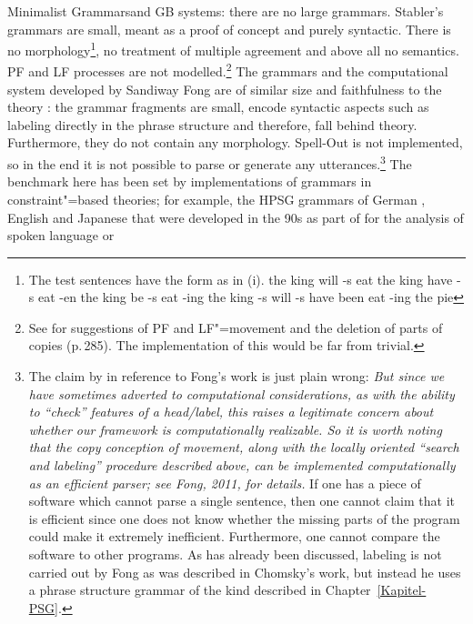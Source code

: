 Minimalist Grammars\indexmg and GB systems: there are no large grammars. Stabler's grammars are small, meant as a proof of concept and purely
syntactic. There is no morphology\footnote{%
	The test sentences have the form as in (i).
\eal
\ex the king will -s eat
\ex the king have -s eat -en
\ex the king be -s eat -ing
\ex the king -s will -s have been eat -ing the pie
\zllast
}, no treatment of multiple agreement \citep[Section~27.4.3]{Stabler2010b} and above all no semantics. PF and LF
processes are not modelled.\footnote{%
	See \citet{SE2002a} for suggestions of PF and LF"=movement and the deletion of parts of copies (p.\,285).
	The implementation of this would be far from trivial.
} 
The grammars and the computational system developed by Sandiway Fong are of similar size and faithfulness
to the theory \citep{FG2012a,Fong2014a}: the grammar fragments are small,
encode syntactic aspects such as labeling directly in the phrase structure \citep[Section~4]{FG2012a} and therefore, fall behind \xbar theory.
Furthermore, they do not contain any morphology. Spell-Out is not implemented, so in the end it is not possible to parse or generate any 
utterances.\footnote{%
	The claim by \citet*[]{BPYC2011a} in reference to Fong's work is just plain wrong: \emph{But since we have
    sometimes adverted to computational considerations, as with the ability to ``check'' features of
    a head/label, this raises a legitimate concern about whether our framework is computationally
    realizable. So it is worth noting that the copy conception of movement, along with the locally
    oriented ``search and labeling'' procedure described above, can be implemented computationally
    as an efficient parser; see Fong, 2011, for details.} If one has a piece of software which cannot
	parse a single sentence, then one cannot claim that it is efficient since one does not know whether the 
	missing parts of the
	program could make it extremely inefficient. Furthermore, one cannot compare the software to other programs.
	As has already been discussed, labeling is not carried out by Fong as was described in
        Chomsky's work, but instead he uses a phrase structure grammar  of the kind described in Chapter~\ref{Kapitel-PSG}.%
}
The benchmark here has been set by implementations of grammars in constraint"=based theories; for example, the
HPSG grammars of German \citep{MK2000a}, English \citep*{FCS2000a}and
Japanese \citep{Siegel2000a} that were developed
in the 90s as part of \verbmobil \citep{Wahlster2000a-ed-not-crossreferenced} for the analysis of spoken language  or
